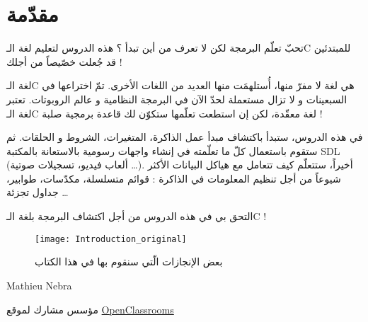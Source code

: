 \chapter*{مقدّمة}

تحبّ تعلّم البرمجة لكن لا تعرف من أين تبدأ ؟ هذه الدروس لتعليم لغة الـ\textenglish{C}
للمبتدئين قد جُعلت خصّيصاً من أجلك !

لغة الـ\textenglish{C}
هي لغة لا مفرّ منها، أُستلهمَت منها العديد من اللغات الأخرى. تمّ اختراعها في السبعينات و لا تزال مستعملة لحدّ الآن في البرمجة النظامية و عالم الروبوتات. تعتبر لغة الـ\textenglish{C}
لغة معقّدة، لكن إن استطعت تعلّمها ستكوّن لك قاعدة برمجية صلبة !

في هذه الدروس، ستبدأ باكتشاف مبدأ عمل الذاكرة، المتغيرات، الشروط و الحلقات. ثم ستقوم باستعمال كلّ ما تعلّمته في إنشاء واجهات رسومية بالاستعانة بالمكتبة
\textenglish{SDL}
 (ألعاب فيديو، تسجيلات صوتية \dots). أخيراً، ستتعلّم كيف تتعامل مع هياكل البيانات الأكثر شيوعاً من أجل تنظيم المعلومات في الذاكرة : قوائم متسلسلة، مكدّسات، طوابير، جداول تجزئة \dots

التحق بي في هذه الدروس من أجل اكتشاف البرمجة بلغة الـ\textenglish{C} !

\begin{figure}[H]
	\centering
	\texttt{[image: Introduction\_original]}
	
	بعض الإنجازات الّتي سنقوم بها في هذا الكتاب
\end{figure}

\vfill
\hfill\parbox{0.3\textwidth}{\centering \textenglish{Mathieu Nebra}

مؤسس مشارك لموقع
\href{http://openclassrooms.com/}{\textenglish{OpenClassrooms}}
}